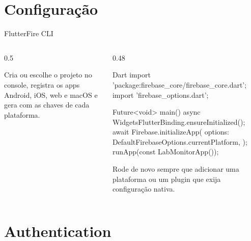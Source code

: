 \documentclass[aspectratio=169,10pt]{beamer}
\begin{document}
\section{Configuração}

\begin{frame}[fragile]{FlutterFire CLI}
  \begin{columns}[T]
    \begin{column}{0.5\textwidth}
      \begin{conceito}
        Cria ou escolhe o projeto no console, registra os apps Android, iOS, web e macOS e gera  com as chaves de cada plataforma.
      \end{conceito}
    \end{column}
    \begin{column}{0.48\textwidth}
\begin{codigo}[title=main.dart]{Dart}
import 'package:firebase_core/firebase_core.dart';
import 'firebase_options.dart';

Future<void> main() async {
  WidgetsFlutterBinding.ensureInitialized();
  await Firebase.initializeApp(
    options: DefaultFirebaseOptions.currentPlatform,
  );
  runApp(const LabMonitorApp());
}
\end{codigo}
      \begin{dica}
        Rode  de novo sempre que adicionar uma plataforma ou um plugin que exija configuração nativa.
      \end{dica}
    \end{column}
  \end{columns}
\end{frame}

\section{Authentication}
\end{document}

